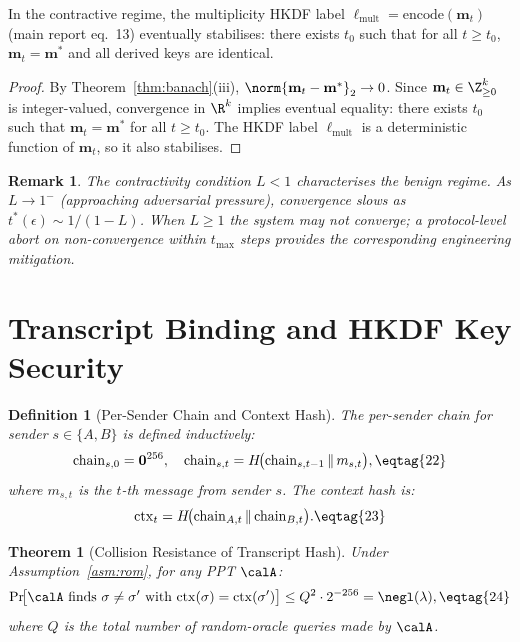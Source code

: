 \documentclass[11pt,letterpaper]{article}
\newtheorem{definition}{Definition}[section]
\newtheorem{theorem}{Theorem}[section]
\newtheorem{remark}{Remark}[section]
\begin{document}
\begin{corollary}\label{cor:label-stable}
In the contractive regime, the multiplicity HKDF label
$\ell_{\mathrm{mult}} = \mathrm{encode}(\mathbf{m}_t)$ (main report eq.\ 13)
eventually stabilises: there exists $t_0$ such that for all $t \geq t_0$,
$\mathbf{m}_t = \mathbf{m}^*$ and all derived keys are identical.
\end{corollary}

\begin{proof}
By Theorem~\ref{thm:banach}(iii), $\norm{\mathbf{m}_t - \mathbf{m}^*}_2 \to 0$.
Since $\mathbf{m}_t \in \Z_{\geq 0}^k$ is integer-valued, convergence in $\R^k$
implies eventual equality: there exists $t_0$ such that $\mathbf{m}_t = \mathbf{m}^*$
for all $t \geq t_0$. The HKDF label $\ell_{\mathrm{mult}}$ is a deterministic
function of $\mathbf{m}_t$, so it also stabilises.
\end{proof}

\begin{remark}
The contractivity condition $L < 1$ characterises the \emph{benign regime}.
As $L \to 1^-$ (approaching adversarial pressure), convergence slows
as $t^*(\epsilon) \sim 1/(1-L)$. When $L \geq 1$ the system may not converge;
a protocol-level abort on non-convergence within $t_{\max}$ steps provides
the corresponding engineering mitigation.
\end{remark}

\section{Transcript Binding and HKDF Key Security}
\label{sec:hkdf}

\begin{definition}[Per-Sender Chain and Context Hash]\label{def:chain}
The per-sender chain for sender $s \in \{A,B\}$ is defined inductively:
\[
  \mathrm{chain}_{s,0} = \mathbf{0}^{256}, \quad
  \mathrm{chain}_{s,t} = H\!\bigl(\mathrm{chain}_{s,t-1} \,\|\, m_{s,t}\bigr), \eqtag{22}
\]
where $m_{s,t}$ is the $t$-th message from sender $s$.
The context hash is:
\[
  \mathrm{ctx}_t = H\!\bigl(\mathrm{chain}_{A,t} \,\|\, \mathrm{chain}_{B,t}\bigr). \eqtag{23}
\]
\end{definition}

\begin{theorem}[Collision Resistance of Transcript Hash]\label{thm:ctx-cr}
Under Assumption~\ref{asm:rom}, for any PPT $\calA$:
\[
  \Pr\!\bigl[\calA \text{ finds } \sigma \neq \sigma'
    \text{ with } \mathrm{ctx}(\sigma) = \mathrm{ctx}(\sigma')\bigr]
  \leq Q^2 \cdot 2^{-256} = \negl(\lambda), \eqtag{24}
\]
where $Q$ is the total number of random-oracle queries made by $\calA$.
\end{theorem}
\end{document}
